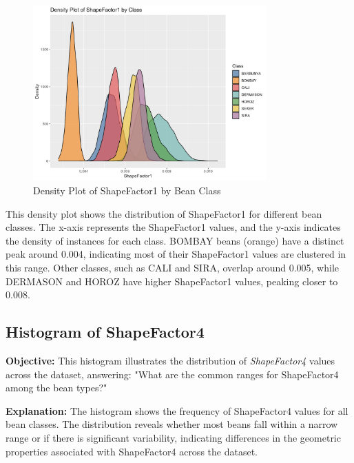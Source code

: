 \documentclass[a4paper,12pt]{article}
\begin{document}
\begin{figure}[H]
    \centering
    \includegraphics[width=0.8\textwidth]{graphs/density_shapefactor1.png}
    \caption{Density Plot of ShapeFactor1 by Bean Class}
    \label{fig:density_shapefactor1}
\end{figure}
This density plot shows the distribution of ShapeFactor1 for different bean classes. The x-axis represents the ShapeFactor1 values, and the y-axis indicates the density of instances for each class. BOMBAY beans (orange) have a distinct peak around 0.004, indicating most of their ShapeFactor1 values are clustered in this range. Other classes, such as CALI and SIRA, overlap around 0.005, while DERMASON and HOROZ have higher ShapeFactor1 values, peaking closer to 0.008.

\newpage

\subsection{Histogram of ShapeFactor4}
\noindent\textbf{Objective:} This histogram illustrates the distribution of \textit{ShapeFactor4} values across the dataset, answering: "What are the common ranges for ShapeFactor4 among the bean types?"

\noindent\textbf{Explanation:} The histogram shows the frequency of ShapeFactor4 values for all bean classes. The distribution reveals whether most beans fall within a narrow range or if there is significant variability, indicating differences in the geometric properties associated with ShapeFactor4 across the dataset.
\end{document}
